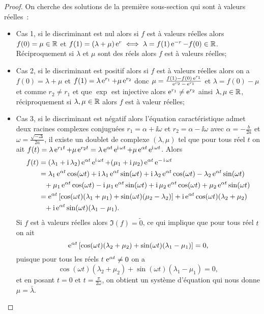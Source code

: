\begin{proof}
  On cherche des solutions de la première sous-section qui sont à valeurs réelles~:
  \begin{itemize}
  \item Cas 1, si le discriminant est nul alors si \(f\) est à valeurs réelles alors \(f(0)=\mu \in \mathbb{R}\) et \(f(1)=(\lambda+\mu)\operatorname{e}^r \iff \lambda=f(1)\operatorname{e}^{-r}-f(0) \in \mathbb{R}\). Réciproquement si \(\lambda\) et \(\mu\) sont des réels alors \(f\) est à valeurs réelles;
  \item Cas 2, si le discriminant est positif alors si \(f\) est à valeurs réelles alors on a \(f(0)=\lambda + \mu\) et \(f(1)=\lambda \operatorname{e}^{r_1} + \mu \operatorname{e}^{r_2}\) donc \(\mu=\frac{f(1)-f(0)\operatorname{e}^{r_1}}{\operatorname{e}^{r_2}-\operatorname{e}^{r_1}}\) et \(\lambda = f(0) - \mu\) et comme \(r_2 \neq r_1\) et que \(\exp\) est injective alors \(\operatorname{e}^{r_1} \neq \operatorname{e}^{r_2}\) ainsi \(\lambda, \mu \in \mathbb{R}\), réciproquement si \(\lambda, \mu \in \mathbb{R}\) alors \(f\) est à valeur réelles;
  \item Cas 3, si le discriminant est négatif alors l'équation caractéristique admet deux racines complexes conjuguées \(r_1=\alpha+\ii \omega\) et \(r_2=\alpha-\ii \omega\) avec \(\alpha=-\frac{b}{2a}\) et \(\omega=\frac{\sqrt{-\Delta}}{2a}\), il existe un doublet de complexe \((\lambda, \mu)\) tel que pour tous réel \(t\) on ait \(f(t)=\lambda \operatorname{e}^{r_1 t} + \mu \operatorname{e}^{r_2 t}=\lambda \operatorname{e}^{\alpha t} \operatorname{e}^{\operatorname{i} \omega t} + \mu \operatorname{e}^{\alpha t} \operatorname{e}^{\operatorname{i} \omega t}\). Alors
      \begin{align}
        f(t)&=(\lambda_1 + \operatorname{i} \lambda_2) \operatorname{e}^{\alpha t} \operatorname{e}^{\operatorname{i} \omega t} +(\mu_1 + \operatorname{i} \mu_2) \operatorname{e}^{\alpha t} \operatorname{e}^{-\operatorname{i} \omega t} \\
       &= \lambda_1\operatorname{e}^{\alpha t} \cos(\omega t) + \operatorname{i} \lambda_1 \operatorname{e}^{\alpha t} \sin(\omega t) + \operatorname{i} \lambda_2 \operatorname{e}^{\alpha t} \cos(\omega t) - \lambda_2 \operatorname{e}^{\alpha t} \sin(\omega t) \notag \\ 
       &\phantom{=}+ \mu_1\operatorname{e}^{\alpha t}\cos(\omega t) -\operatorname{i} \mu_1 \operatorname{e}^{\alpha t} \sin(\omega t) + \operatorname{i}\mu_2 \operatorname{e}^{\alpha t} \cos(\omega t) + \mu_2 \operatorname{e}^{\alpha t} \sin(\omega t) \\  
       &=\operatorname{e}^{\alpha t} \left[ \cos(\omega t) (\lambda_1+\mu_1)+ \sin(\omega t)(\mu_2-\lambda_2)\right]+\operatorname{i}\operatorname{e}^{\alpha t} \cos(\omega t) (\lambda_2+\mu_2) \notag \\ 
       &\phantom{=}+ \operatorname{i}\operatorname{e}^{\alpha t} \sin(\omega t)(\lambda_1-\mu_1).
      \end{align}
Si \(f\) est à valeurs réelles alors \(\Im(f)=\tilde{0}\), ce qui implique que pour tous réel \(t\) on ait
\begin{equation}
  \operatorname{e}^{\alpha t} \left[ \cos(\omega t) (\lambda_2+\mu_2)+ \sin(\omega t)(\lambda_1-\mu_1)\right] = 0,
\end{equation}
puisque pour tous les réels \(t\) \(\operatorname{e}^{\alpha t} \neq 0\) on a
\begin{equation}
  \cos(\omega t) (\lambda_2+\mu_2)+ \sin(\omega t)(\lambda_1-\mu_1) = 0,
\end{equation}
et en posant \(t=0\) et \(t=\frac{\pi}{2 \omega}\), on obtient un système d'équation qui nous donne \(\mu=\bar{\lambda}\).


\end{itemize}
\end{proof}
